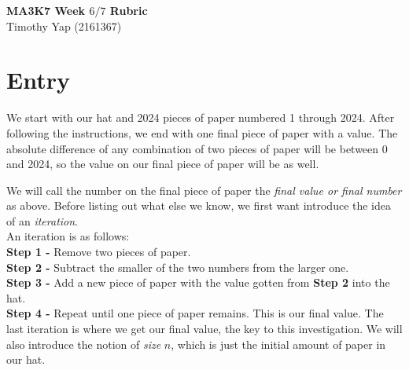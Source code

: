 \documentclass[11pt]{article}
\newcommand{\keywordfont}{\textsc}
\newcommand{\keyword}[1]{%
  \marginpar{\raggedright\small\keywordfont{#1}}}
\begin{document}
\Large
\begin{center}
\textbf{MA3K7 Week $6/7$ Rubric}
\\
Timothy Yap (2161367)
\end{center}
\normalsize







\section{Entry} %



We start with \keyword{I know} our hat and 2024 pieces of paper numbered 1 through 2024. After following the instructions, we end with one final piece of paper with a value. The absolute difference of any combination of two pieces of paper will be between 0 and 2024, so the value on our final piece of paper will be as well.

We will call \keyword{Introduce} the number on the final piece of paper the \textit{final value or final number} as above. Before listing out what else we know, we first want introduce  the idea of an \textit{iteration}. \\
An iteration is as follows: \\
\textbf{Step 1 -} Remove two pieces of paper. \\
\textbf{Step 2 -} Subtract the smaller of the two numbers from the larger one. \\
\textbf{Step 3 -} Add a new piece of paper with the value gotten from \textbf{Step 2} into the hat. \\
\textbf{Step 4 -} Repeat until one piece of paper remains. This is our final value. 
The last iteration is where we get our final value, the key to this investigation. We will also introduce the notion of \textit{size} $n$, which is just the initial amount of paper in our hat. 
\end{document}
